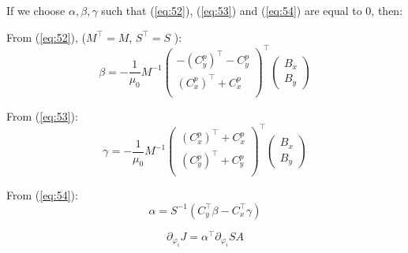 \noindent If we choose $\alpha, \beta, \gamma$ such that  (\ref{eq:52}), (\ref{eq:53}) and (\ref{eq:54}) are equal to $0$, then: 

\noindent From (\ref{eq:52}), ($M^{\top} = M$, $S^{\top} = S$ ): 
\begin{equation} \label{eq:56} 
\beta = - \frac{1}{\mu_0} M^{-1} \begin{pmatrix} -\left(C_y^p\right)^{\top} -C_y^p \\ \left(C_x^p\right)^{\top} + C_x^p \\ \end{pmatrix}^{\top} \begin{pmatrix} B_x \\ B_y  \end{pmatrix}
\end{equation}

\noindent From (\ref{eq:53}): 
\begin{equation} \label{eq:57} 
\gamma = - \frac{1}{\mu_0} M^{-1} \begin{pmatrix} \left(C_x^p\right)^{\top} + C_x^p \\ \left(C_y^p\right)^{\top} + C_y^p \\ \end{pmatrix}^{\top} \begin{pmatrix} B_x \\ B_y \end{pmatrix}
\end{equation}

\noindent From (\ref{eq:54}): 
\begin{equation} \label{eq:58} 
\alpha =  S^{-1} \left( C_y^{\top} \beta - C_x^{\top} \gamma \right)
\end{equation}

\begin{equation} \label{eq:59} 
\partial_{\varphi_i} J = \alpha^{\top} \partial_{\varphi_i} S A 
\end{equation}



